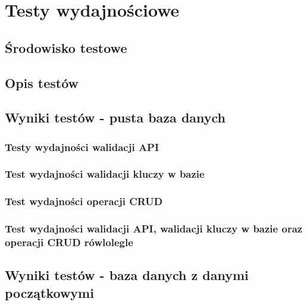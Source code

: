 \chapter{Testy wydajnościowe}
\section{Środowisko testowe}
\section{Opis testów}
\section{Wyniki testów - pusta baza danych}

\newpage
\subsection{Testy wydajności walidacji API}


\clearpage

\newpage
\subsection{Test wydajności walidacji kluczy w bazie}


\clearpage

\newpage
\subsection{Test wydajności operacji CRUD}


\clearpage

\newpage
\subsection{Test wydajności walidacji API, walidacji kluczy w bazie oraz operacji CRUD rówlolegle }


\clearpage

\newpage
\section{Wyniki testów - baza danych z danymi początkowymi}

